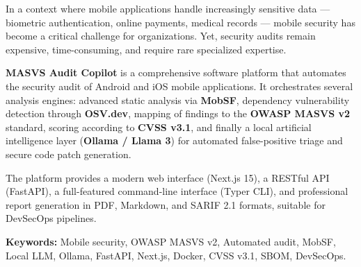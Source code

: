 In a context where mobile applications handle increasingly sensitive data ---
biometric authentication, online payments, medical records --- mobile security
has become a critical challenge for organizations. Yet, security audits remain
expensive, time-consuming, and require rare specialized expertise.

\textbf{MASVS Audit Copilot} is a comprehensive software platform that automates
the security audit of Android and iOS mobile applications. It orchestrates several
analysis engines: advanced static analysis via \textbf{MobSF}, dependency vulnerability
detection through \textbf{OSV.dev}, mapping of findings to the \textbf{OWASP MASVS v2}
standard, scoring according to \textbf{CVSS v3.1}, and finally a local artificial
intelligence layer (\textbf{Ollama / Llama 3}) for automated false-positive triage
and secure code patch generation.

The platform provides a modern web interface (Next.js 15), a RESTful API (FastAPI),
a full-featured command-line interface (Typer CLI), and professional report generation
in PDF, Markdown, and SARIF 2.1 formats, suitable for DevSecOps pipelines.

\begin{tcolorbox}[infobox]
  \textbf{Keywords:} Mobile security, OWASP MASVS v2, Automated audit, MobSF,
  Local LLM, Ollama, FastAPI, Next.js, Docker, CVSS v3.1, SBOM, DevSecOps.
\end{tcolorbox}

\cleardoublepage
